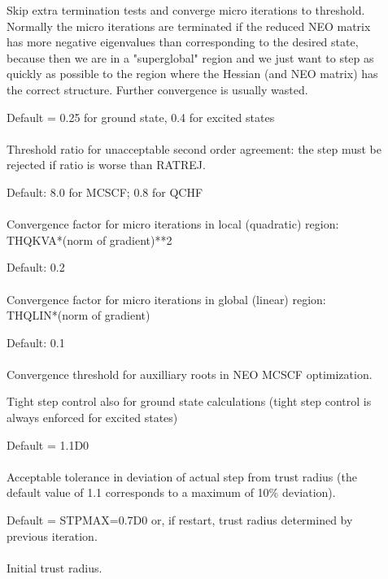 \begin{description}
\item[]
  Skip extra termination tests and converge micro iterations to
  threshold.   Normally the micro iterations are terminated if the
  reduced NEO matrix has more negative eigenvalues than corresponding
  to the desired state, because then we are in a "superglobal" region
  and we just want to step as quickly as possible to the region where
  the Hessian (and NEO matrix) has the correct structure.  Further
  convergence is usually wasted.

\item[]
  Default = 0.25 for ground state, 0.4 for excited states\\
   \\
  Threshold ratio for unacceptable second order agreement: the step
  must be rejected if ratio is worse than RATREJ.

\item[]
  Default: 8.0 for MCSCF; 0.8 for QCHF\\
   \\
  Convergence factor for micro iterations in local (quadratic) region:
  THQKVA*(norm of gradient)**2

\item[]
  Default: 0.2\\
   \\
  Convergence factor for micro iterations in global (linear) region: \\
  THQLIN*(norm of gradient)

\item[]
  Default: 0.1\\
   \\
  Convergence threshold for auxilliary roots in NEO MCSCF optimization.

\item[]
  Tight step control also for ground state calculations
  (tight step control is always enforced for excited states)

\item[]
  Default = 1.1D0\\
   \\
  Acceptable tolerance in deviation of actual step from trust radius
  (the default value of 1.1 corresponds to a maximum of 10\% deviation).

\item[]
  Default = STPMAX=0.7D0 or, if restart, trust radius determined by previous
            iteration.\\
   \\
  Initial trust radius.

\end{description}


